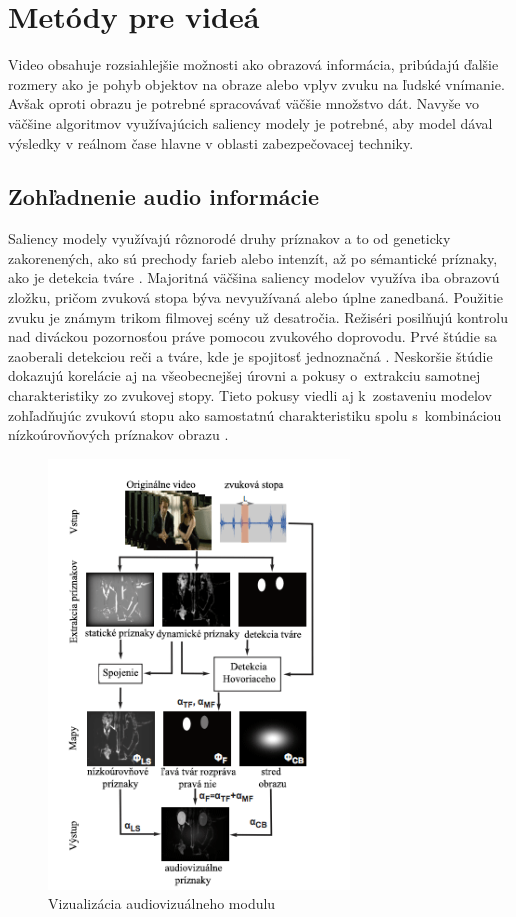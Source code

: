\section{Metódy pre videá}
Video obsahuje rozsiahlejšie možnosti ako obrazová informácia, pribúdajú ďalšie rozmery ako je pohyb objektov na obraze alebo vplyv zvuku na ľudské vnímanie.
Avšak oproti obrazu je potrebné spracovávať väčšie množstvo dát.
Navyše vo väčšine algoritmov využívajúcich saliency modely je potrebné, aby model dával výsledky v reálnom čase hlavne v oblasti zabezpečovacej techniky.
\subsection{Zohľadnenie audio informácie}
Saliency modely využívajú rôznorodé druhy príznakov a to od geneticky zakorenených, ako sú prechody farieb alebo intenzít, až po sémantické príznaky, ako je detekcia tváre \cite{salient-faces}.
Majoritná väčšina saliency modelov využíva iba obrazovú zložku, pričom zvuková stopa býva nevyužívaná alebo úplne zanedbaná.
Použitie zvuku je známym trikom filmovej scény už desatročia.
Režiséri posilňujú kontrolu nad diváckou pozornosťou práve pomocou zvukového doprovodu.
Prvé štúdie sa zaoberali detekciou reči a tváre, kde je spojitosť jednoznačná \cite{sound-1}.
Neskoršie štúdie dokazujú korelácie aj na všeobecnejšej úrovni a pokusy o~extrakciu samotnej charakteristiky zo zvukovej stopy\cite{sound-coutrot-1}.
Tieto pokusy viedli aj k~zostaveniu modelov zohľadňujúc zvukovú stopu ako samostatnú charakteristiku spolu s~kombináciou nízkoúrovňových príznakov obrazu \cite{sound-courot-2}.

\begin{figure}[H]
  \centering
  \includegraphics[width=8cm]{pics/courot-1.png}
  \caption{Vizualizácia audiovizuálneho modulu\cite{sound-courot-2}}\label{wrap-fig:4}
\end{figure}
\vspace{10mm}

